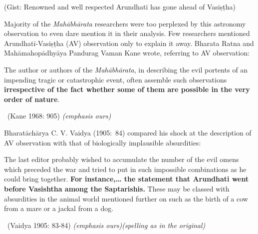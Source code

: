 \vspace{-.3cm}

\vspace{0.1cm} 

(Gist: Renowned and well respected Arundhatī has gone ahead of Vasiṣṭha)

\vspace{0.15cm} 

Majority of the \textit{Mahābhārata} researchers were too perplexed by this astronomy observation to even dare mention it in their analysis. Few researchers mentioned Arundhatī-Vasiṣṭha (AV) observation only to explain it away. Bharata Ratna and Mahāmahopādhyāya Pandurag Vaman Kane wrote, referring to AV observation:

\vspace{0.15cm} 

\begin{myquote}
The author or authors of the \textit{Mahābhārata}, in describing the evil portents of an impending tragic or catastrophic event, often assemble such observations \textbf{irrespective of the fact whether some of them are possible in the very order of nature}. 

\vspace{0.1cm} 

~\hfill (Kane 1968: 905) \textit{(emphasis ours)}
\end{myquote}

\vspace{0.15cm} 

Bharatāchārya C. V. Vaidya (1905:~84) compared his shock at the description of AV observation with that of biologically implausible absurdities:

\vspace{0.15cm} 

\begin{myquote}
The last editor probably wished to accumulate the number of the evil omens which preceded the war and tried to put in such impossible combinations as he could bring together. \textbf{For instance,… the statement that Arundhati went before Vasishtha among the Saptarishis.} These may be classed with absurdities in the animal world mentioned further on such as the birth of a cow from a mare or a jackal from a dog. 

\vspace{0.1cm} 

~\hfill (Vaidya 1905: 83-84) \textit{(emphasis ours)(spelling as in the original)}
\end{myquote}

